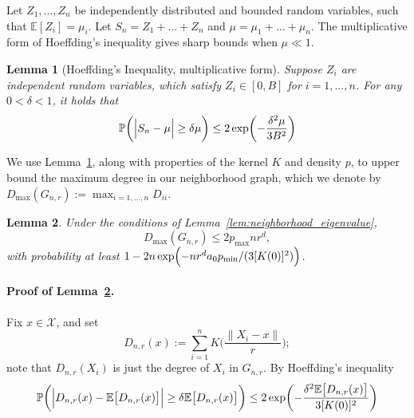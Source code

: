 \documentclass[twoside]{article}
\newcommand{\1}{\mathbf{1}}
\newcommand{\Xset}{\mathcal{X}}
\newcommand{\Pbb}{\mathbb{P}}
\newcommand{\Ebb}{\mathbb{E}}
\newtheorem{lemma}{Lemma}
\theoremstyle{definition}
\theoremstyle{remark}
\begin{document}
Let $Z_1,\ldots,Z_n$ be independently distributed and bounded random variables, such that $\Ebb[Z_i] = \mu_i$. Let $S_n = Z_1 + \ldots + Z_n$ and $\mu = \mu_1 + \ldots + \mu_n$. The multiplicative form of Hoeffding's inequality gives sharp bounds when $\mu \ll 1$. 
\begin{lemma}[Hoeffding's Inequality, multiplicative form]
	\label{lem:hoeffding}
	Suppose $Z_i$ are independent random variables, which satisfy $Z_i \in [0,B]$ for $i = 1,\ldots,n$. For any $0 < \delta < 1$, it holds that
	\begin{equation*}
	\Pbb\biggl(\Bigl|S_n - \mu\Bigr| \geq \delta \mu\biggr) \leq 2\exp\biggl(-\frac{\delta^2\mu}{3B^2}\biggr)
	\end{equation*}
\end{lemma}
We use Lemma~\ref{lem:hoeffding}, along with properties of the kernel $K$ and density $p$, to upper bound the maximum degree in our neighborhood graph, which we denote by $D_{\max}(G_{n,r}) := \max_{i = 1,\ldots,n} D_{ii}$.
\begin{lemma}
	\label{lem:max_degree}
	Under the conditions of Lemma~\ref{lem:neighborhood_eigenvalue},
	\begin{equation*}
	D_{\max}(G_{n,r}) \leq 2p_{\max}nr^d,
	\end{equation*}
	with probability at least $1 - 2n\exp\Bigl(-nr^da_0p_{\min}/(3[K(0)]^2)\Bigr)$. 
\end{lemma}
\paragraph{Proof of Lemma~\ref{lem:max_degree}.}
Fix $x \in \Xset$, and set
\begin{equation*}
D_{n,r}(x) :=  \sum_{i = 1}^{n} K\biggl(\frac{\|X_i - x\|}{r}\biggr);
\end{equation*}
note that $D_{n,r}(X_i)$ is just the degree of $X_i$ in $G_{n,r}$. By Hoeffding's inequality
\begin{equation}
\label{pf:max_degree_1}
\Pbb\biggl(\Bigl|D_{n,r}(x) - \Ebb\bigl[D_{n,r}(x)\bigr]\Bigr| \geq \delta \Ebb\bigl[D_{n,r}(x)\bigr]\biggr) \leq 2\exp\biggl(-\frac{\delta^2\Ebb\bigl[D_{n,r}(x)\bigr]}{3[K(0)]^2}\biggr)
\end{equation}
\end{document}
